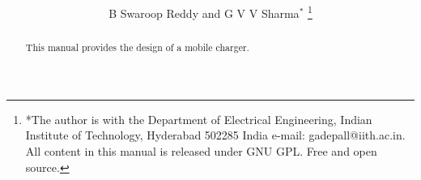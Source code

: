 \documentclass[journal,12pt,twocolumn]{IEEEtran}
\begin{document}
\let\StandardTheFigure\thefigure
\renewcommand{\thefigure}{\theproblem}



\makeatletter
{}
\makeatother

\let\StandardTheFigure\thefigure
\let\StandardTheTable\thetable





\def\putbox#1#2#3{\makebox[0in][l]{\makebox[#1][l]{}\raisebox{\baselineskip}[0in][0in]{\raisebox{#2}[0in][0in]{#3}}}}
     \def\rightbox#1{\makebox[0in][r]{#1}}
     \def\centbox#1{\makebox[0in]{#1}}
     \def\topbox#1{\raisebox{-\baselineskip}[0in][0in]{#1}}
     \def\midbox#1{\raisebox{-0.5\baselineskip}[0in][0in]{#1}}

\vspace{3cm}

\title{ 
}

\author{B Swaroop Reddy and  G V V Sharma$^{*}$%
	\thanks{*The author is with the Department
		of Electrical Engineering, Indian Institute of Technology, Hyderabad
		502285 India e-mail:  gadepall@iith.ac.in. All content in this manual is released under GNU GPL.  Free and open source.}
	
}	

\maketitle

\tableofcontents
\bigskip

\begin{abstract}
	
	This manual provides the design of a mobile charger.
	
\end{abstract}

\end{document}
